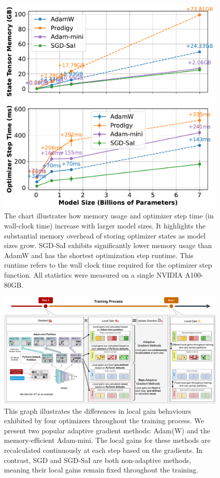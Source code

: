 
\begin{figure}[h!]
    \centering
    \includegraphics[width=\columnwidth]{images/speed_memory_growth.pdf}
    \caption{The chart illustrates how memory usage and optimizer step time (in wall-clock time) increase with larger model sizes. It highlights the substantial memory overhead of storing optimizer states as model sizes grow. SGD-SaI exhibits significantly lower memory usage than AdamW and has the shortest optimization step runtime. This runtime refers to the wall clock time required for the optimizer step function. All statistics were measured on a single NVIDIA A100-80GB.}
    \label{fig:state_tensor_memory}
\end{figure}

\begin{figure}
    \centering
    \includegraphics[width=1.\linewidth]{images/algorithm_overview.pdf}
    \caption{This graph illustrates the differences in local gain behaviours exhibited by four optimizers throughout the training process. We present two popular adaptive gradient methods: Adam(W) and the memory-efficient Adam-mini. The local gains for these methods are recalculated continuously at each step based on the gradients. In contrast, SGD and SGD-SaI are both non-adaptive methods, meaning their local gains remain fixed throughout the training.}
    \label{fig:overview}
\end{figure}



